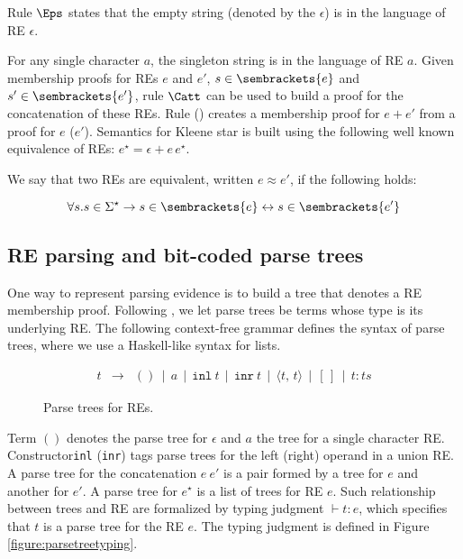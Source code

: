 Rule $\Eps$ states that the empty string (denoted by the $\epsilon$)
is in the language of RE $\epsilon$.


For any single character $a$, the singleton string  is in the language 
of RE $a$. Given membership proofs for REs $e$ and $e'$, $s \in \sembrackets{e}$ 
and $s' \in\sembrackets{e'}$, rule $\Catt$ can be used to build a proof
for the concatenation of these REs.  Rule \Left (\Right) creates a membership proof
for $e + e'$ from a proof for $e$ ($e'$). Semantics for Kleene star
is built using the following well known equivalence of REs: $e^\star
= \epsilon + e\,e^\star$. 


We say that two REs are equivalent, written $e\approx e'$, if the following holds:

\[
\forall s. s\in \Sigma^\star \to s \in\sembrackets{e} \leftrightarrow s\in\sembrackets{e'} 
\]



\subsection{RE parsing and bit-coded parse trees}




One way to represent parsing evidence is to build a tree that denotes
a RE membership proof. Following \cite{Lasse2011,Frisch2004}, we let
parse trees be terms whose type is its underlying RE. The following context-free 
grammar defines the syntax of parse trees, where we use a Haskell-like syntax for 
lists.

\begin{figure}[h]
   \[
      \begin{array}{lcl}
         t & \to & () \,\mid\, a \,\mid\, \texttt{inl}\:t  \,\mid\, \texttt{inr}\:t  \,\mid\, \langle t,\,t\rangle  \,\mid\, [\,]\,\mid\,t : ts
      \end{array}
   \]
   \caption{Parse trees for REs.}
   \label{figure:parsetreesyntax}
\end{figure}



Term $()$ denotes the parse tree for $\epsilon$ and $a$ the tree for a single character RE. 
Constructor\texttt{inl} (\texttt{inr}) tags parse trees for the left (right) operand in 
a union RE. A parse tree for the concatenation $e\:e'$ is a pair formed by a tree for $e$ and 
another for $e'$. A parse tree for $e^\star$ is a list of trees for RE $e$. Such relationship 
between trees and RE are formalized by typing judgment $\vdash t : e$, which specifies that 
$t$ is a parse tree for the RE $e$. The typing judgment is defined in Figure \ref{figure:parsetreetyping}.



